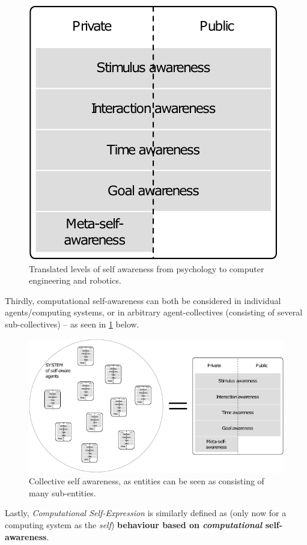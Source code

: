 	\begin{figure}[!htp]
	\centering
	\includegraphics[width=0.5\columnwidth]{Assets/DocSegments/Chapters/Background/Figures/Schema/SA_levels.pdf}
	\caption{Translated levels of self awareness from psychology to computer engineering and robotics.}
	\end{figure}

	Thirdly, computational self-awareness can both be considered in individual agents/computing systems, or in arbitrary agent-collectives (consisting of several sub-collectives) -- as seen in \ref{fig:collective_SA} below.

	\begin{figure}[!htp]
	\centering
	\includegraphics[width=\columnwidth]{Assets/DocSegments/Chapters/Background/Figures/Schema/collective_SA.pdf}
	\caption{Collective self awareness, as entities can be seen as consisting of many sub-entities.}
	\label{fig:collective_SA}
	\end{figure}

	Lastly, \textit{Computational Self-Expression} is similarly defined as  (only now for a computing system as the \textit{self}) \textbf{behaviour based on \textit{computational} self-awareness}.
	\newline

